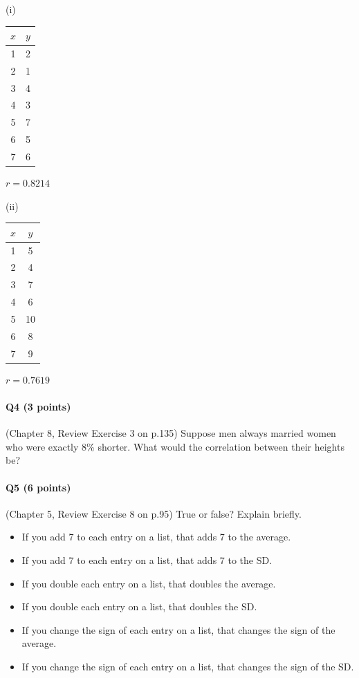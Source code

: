 \documentclass[11pt]{article}
\begin{document}
\medskip

\noindent
\begin{minipage}{0.45\textwidth}
\begin{center}
(i)

\begin{tabular}{cc}
$x$ & $y$ \\ \hline
1 & 2 \\
2 & 1 \\
3 & 4 \\
4 & 3 \\
5 & 7 \\
6 & 5 \\
7 & 6 \\
\end{tabular}

\medskip
$r = 0.8214$
\end{center}
\end{minipage}
\hfill
\begin{minipage}{0.45\textwidth}
\begin{center}
(ii)

\begin{tabular}{cc}
$x$ & $y$ \\ \hline
1 & 5 \\
2 & 4 \\
3 & 7 \\
4 & 6 \\
5 & 10 \\
6 & 8 \\
7 & 9 \\
\end{tabular}

\medskip
$r = 0.7619$
\end{center}
\end{minipage}


\paragraph{Q4 (3 points)} (Chapter 8, Review Exercise 3 on p.135) Suppose men always married women who were exactly 8\% shorter. What would the correlation between their heights be?

\paragraph{Q5 (6 points)} (Chapter 5, Review Exercise 8 on p.95) True or false? Explain briefly.
\begin{itemize}
    \item[(a)] If you add 7 to each entry on a list, that adds 7 to the average.
    \item[(b)] If you add 7 to each entry on a list, that adds 7 to the SD.
    \item[(c)] If you double each entry on a list, that doubles the average.
    \item[(d)] If you double each entry on a list, that doubles the SD.
    \item[(e)] If you change the sign of each entry on a list, that changes the sign of the average.
    \item[(f)] If you change the sign of each entry on a list, that changes the sign of the SD.
\end{itemize}
\end{document}
